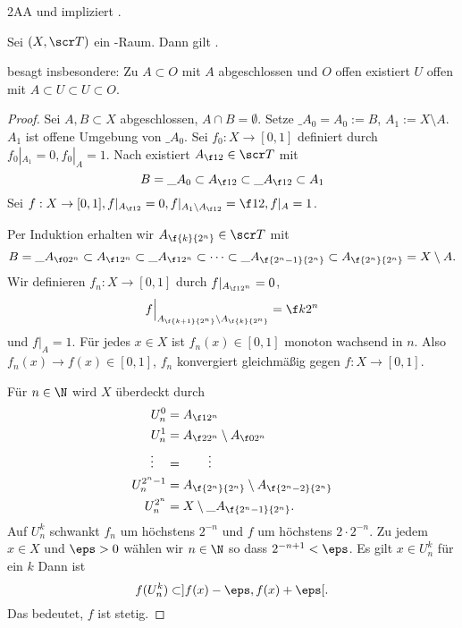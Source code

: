 \begin{lem}[Tychonoff]
	2AA und  impliziert .
\end{lem}

\begin{st}[Urysohn]
	Sei $(X, \scr T)$ ein -Raum.
	Dann gilt .
	\begin{note}
		 besagt insbesondere:
		Zu $A \subset O$ mit $A$ abgeschlossen und $O$ offen existiert $U$ offen mit $A \subset U \subset U \subset O$.
	\end{note}
	\begin{proof}
		Sei $A, B \subset X$ abgeschlossen, $A \cap B = \emptyset$.
		Setze $\_{A_0} = A_0 := B$, $A_1 := X \setminus A$.
		$A_1$ ist offene Umgebung von $\_{A_0}$.
		Sei $f_0: X \to [0,1]$ definiert durch $f_0|_{A_1} = 0, f_0|_{A} = 1$.
		Nach  existiert $A_{\f 12} \in \scr T$ mit
		\[
			B = \_{A_0} \subset A_{\f 12} \subset \_{A_{\f 12}} \subset A_1
		\]
		Sei $f: X \to [0,1], f|_{A_{\f 12}} = 0, f|_{A_1 \setminus A_{\f 12}} = \f 12, f|_A = 1$.

		Per Induktion erhalten wir $A_{\f {k}{2^n}} \in \scr T$ mit
		\[
			B = \_{A_{\f 0{2^n}}} \subset A_{\f 1{2^n}} \subset \_{A_{\f 1{2^n}}}
			\subset \dotsb \subset
			\_{A_{\f{2^n - 1}{2^n}}}
			\subset A_{\f {2^n}{2^n}}
			= X \setminus A.
		\]
		Wir definieren $f_n : X \to [0,1]$ durch $f|_{A_{\f 1{2^n}}} = 0$,
		\[
			f\Big|_{A_{\f {k+1}{2^n}} \setminus A_{\f {k}{2^n}}}
			= \f k{2^n}
		\]
		und $f|_A = 1$.
		Für jedes $x \in X$ ist $f_n(x) \in [0,1]$ monoton wachsend in $n$.
		Also $f_n(x) \to f(x) \in [0,1]$, $f_n$ konvergiert gleichmäßig gegen $f: X \to [0,1]$.

		Für $n \in \N$ wird $X$ überdeckt durch
		\begin{align*}
			U_n^0 &= A_{\f 1{2^n}} \\
			U_n^1 &= A_{\f 2{2^n}} \setminus A_{\f 0{2^n}} \\
			\vdots \quad &= \qquad \vdots \\
			U_n^{2^n-1} &= A_{\f {2^n}{2^n}} \setminus A_{\f {2^n-2}{2^n}} \\
			U_n^{2^n} &= X \setminus \_{A_{\f {2^n-1}{2^n}}}.
		\end{align*}
		Auf $U_n^k$ schwankt $f_n$ um höchstens $2^{-n}$ und $f$ um höchstens $2\cdot 2^{-n}$.
		Zu jedem $x \in X$ und $\eps > 0$ wählen wir $n \in \N$ so dass $2^{-n+1} < \eps$.
		Es gilt $x \in U_n^k$ für ein $k$
		Dann ist
		\[
			f(U_n^k) \subset ]f(x) - \eps, f(x) + \eps[.
		\]
		Das bedeutet, $f$ ist stetig.
	\end{proof}
\end{st}

